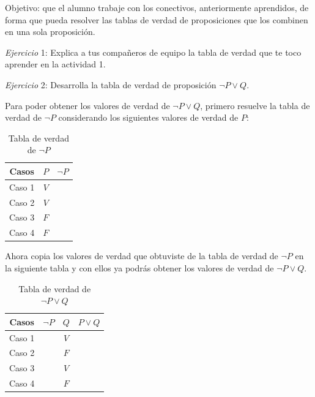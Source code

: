 \documentclass[letterpaper, twoside]{article}
\begin{document}
Objetivo: que el alumno trabaje con los conectivos, anteriormente aprendidos, de forma que pueda resolver las tablas de verdad de proposiciones que los combinen en una sola proposición.

\vspace{.5cm}

\textit{Ejercicio} 1: Explica a tus compañeros de equipo la tabla de verdad que te toco aprender en la actividad 1.

\vspace{1cm}

\textit{Ejercicio} 2: Desarrolla la tabla de verdad de proposición $\lnot P\lor Q$.\par
Para poder obtener los valores de verdad de $\lnot P\lor Q$, primero resuelve la tabla de verdad de $\lnot P$ considerando los siguientes valores de verdad de $P$:

\vspace{.5cm}

\begin{table}[h]
  \centering
  \begin{tabular}{|c|c|c|}
    \hline
    Casos  & $P$ & $\lnot P$ \\ \hline
    Caso 1 & $V$ &  \\ \hline
    Caso 2 & $V$ &  \\ \hline
    Caso 3 & $F$ &  \\ \hline
    Caso 4 & $F$ &  \\ \hline 
  \end{tabular}
  \caption*{Tabla de verdad de $\lnot P$}
\end{table}

\vspace{1cm}

Ahora copia los valores de verdad que obtuviste de la tabla de verdad de $\lnot P$ en la siguiente tabla y con ellos ya podrás obtener los valores de verdad de $\lnot P\lor Q$.

\vspace{.5cm}

\begin{table}[h]
  \centering
  \begin{tabular}{|c|c|c|c|}
    \hline
    Casos  & $\lnot P$ & $Q$ & $P\lor Q$ \\ \hline
    Caso 1 & & $V$ &  \\ \hline
    Caso 2 & & $F$ &  \\ \hline
    Caso 3 & & $V$ &  \\ \hline
    Caso 4 & & $F$ &  \\ \hline 
  \end{tabular}
  \caption*{Tabla de verdad de $\lnot P\lor Q$}
\end{table}
\end{document}
